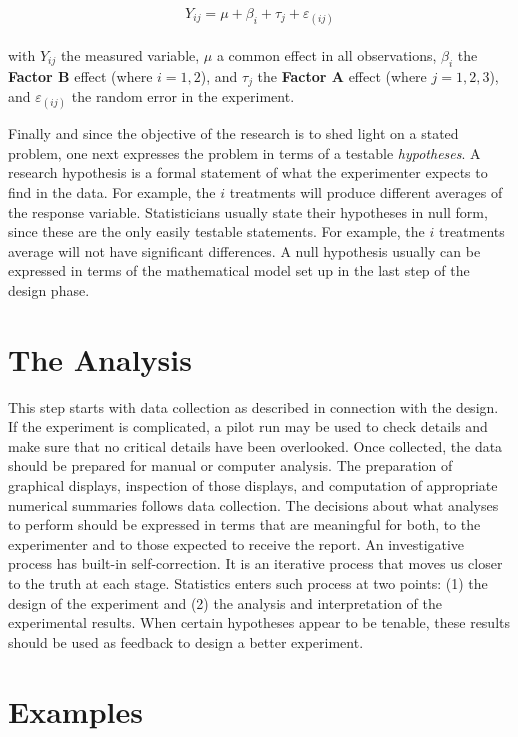 \documentclass{WileySev}
\begin{document}
\begin{equation}
Y_{ij}= \mu+\beta_i+\tau_j+\varepsilon_{(ij)} \label{eq:1} %
\end{equation}
\\
with $Y_{ij}$  the measured variable, $\mu$ a common effect in all observations, $\beta_i$ the \textbf{Factor B} effect (where $i = 1, 2$), and $\tau_j$ the \textbf{Factor A} effect (where $j = 1, 2, 3$), and $\varepsilon_{(ij)}$ the random error in the experiment.

Finally and since the objective of the research is to shed light on a stated problem, one next expresses the problem in terms of a testable \textit{hypotheses}. A research hypothesis is a formal statement of what the experimenter expects to find in the data. For example, the $i$ treatments will produce different averages of the response variable. Statisticians usually state their hypotheses in null form, since these are the only easily testable statements. For example, the $i$ treatments average will not have significant differences. A null hypothesis usually can be expressed in terms of the mathematical model set up in the last step of the design phase.

\section{The Analysis}

This step starts with data collection as described in connection with the design. If the experiment is complicated, a pilot run may be used to check details and make sure that no critical details have been overlooked. Once collected, the data should be prepared for manual or computer analysis. The preparation of graphical displays, inspection of those displays, and computation of appropriate numerical summaries follows data collection. The decisions about what analyses to perform should be expressed in terms that are meaningful for both, to the experimenter and to those expected to receive the report.
An investigative process has built-in self-correction. It is an iterative process that moves us closer to the truth at each stage. Statistics enters such process at two points: (1) the design of the experiment and (2) the analysis and interpretation of the experimental results. When certain hypotheses appear to be tenable, these results should be used as feedback to design a better experiment.

\section{Examples}
\end{document}
